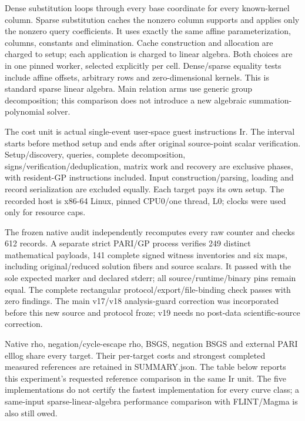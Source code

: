 \documentclass[
  10pt,
]{article}
\begin{document}
Dense substitution loops through every base coordinate for every
known-kernel column. Sparse substitution caches the nonzero column
supports and applies only the nonzero query coefficients. It uses
exactly the same affine parameterization, columns, constants and
elimination. Cache construction and allocation are charged to setup;
each application is charged to linear algebra. Both choices are in one
pinned worker, selected explicitly per cell. Dense/sparse equality tests
include affine offsets, arbitrary rows and zero-dimensional kernels.
This is standard sparse linear algebra. Main relation arms use generic
group decomposition; this comparison does not introduce a new algebraic
summation-polynomial solver.

The cost unit is actual single-event user-space guest instructions Ir.
The interval starts before method setup and ends after original
source-point scalar verification. Setup/discovery, queries, complete
decomposition, signs/verification/deduplication, matrix work and
recovery are exclusive phases, with resident-GP instructions included.
Input construction/parsing, loading and record serialization are
excluded equally. Each target pays its own setup. The recorded host is
x86-64 Linux, pinned CPU0/one thread, L0; clocks were used only for
resource caps.

The frozen native audit independently recomputes every raw counter and
checks 612 records. A separate strict PARI/GP process verifies 249
distinct mathematical payloads, 141 complete signed witness inventories
and six maps, including original/reduced solution fibers and source
scalars. It passed with the sole expected marker and declared stderr;
all source/runtime/binary pins remain equal. The complete rectangular
protocol/export/file-binding check passes with zero findings. The main
v17/v18 analysis-guard correction was incorporated before this new
source and protocol froze; v19 needs no post-data scientific-source
correction.

Native rho, negation/cycle-escape rho, BSGS, negation BSGS and external
PARI elllog share every target. Their per-target costs and strongest
completed measured references are retained in SUMMARY.json. The table
below reports this experiment's requested reference comparison in the
same Ir unit. The five implementations do not certify the fastest
implementation for every curve class; a same-input sparse-linear-algebra
performance comparison with FLINT/Magma is also still owed.
\end{document}
